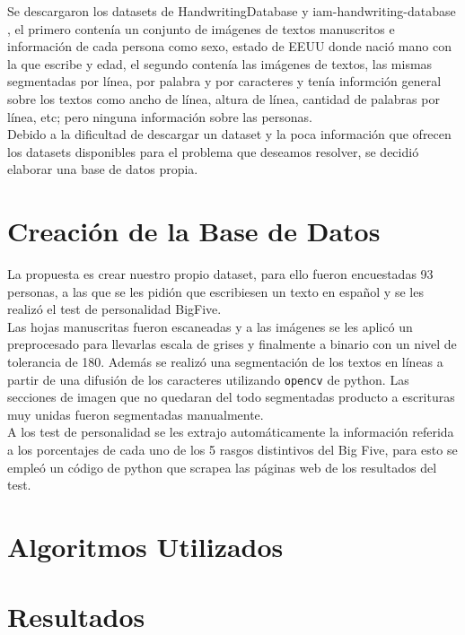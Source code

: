 \documentclass[10pt, a4paper]{article}
\begin{document}
Se descargaron los datasets de HandwritingDatabase \cite{15} y iam-handwriting-database \cite{16}, el primero conten\'ia un conjunto de im\'agenes de textos manuscritos e informaci\'on de cada persona como sexo, estado de EEUU donde naci\'o 
mano con la que escribe y edad, el segundo conten\'ia las im\'agenes de textos, las mismas segmentadas por l\'inea, por palabra y por caracteres y ten\'ia informci\'on general sobre los textos como 
ancho de l\'inea, altura de l\'inea, cantidad de palabras por l\'inea, etc; pero ninguna informaci\'on sobre las personas. \\ 

Debido a la dificultad de descargar un dataset y la poca informaci\'on que ofrecen los datasets disponibles para el problema que deseamos resolver, se decidi\'o elaborar una base de datos propia.

\section{Creaci\'on de la Base de Datos}

La propuesta es crear nuestro propio dataset, para ello fueron encuestadas 93 personas, a las que se les pidi\'on que escribiesen un texto 
en espa\~nol y se les realiz\'o el test de personalidad BigFive. \\ 

Las hojas manuscritas fueron escaneadas y a las im\'agenes se les aplic\'o un preprocesado para llevarlas escala de grises y finalmente a binario con un nivel de tolerancia de 180. Adem\'as se 
realiz\'o una segmentaci\'on de los textos en l\'ineas a partir de una difusi\'on de los caracteres utilizando \texttt{opencv} de python. Las secciones de imagen que no quedaran 
del todo segmentadas producto a escrituras muy unidas fueron segmentadas manualmente.\\ 

A los test de personalidad se les extrajo autom\'aticamente la informaci\'on referida a los porcentajes de cada uno 
de los 5 rasgos distintivos del Big Five, para esto se emple\'o un c\'odigo de python que scrapea las p\'aginas web de los resultados del test.\\ 


\section{Algoritmos Utilizados}
\section{Resultados}
\end{document}

